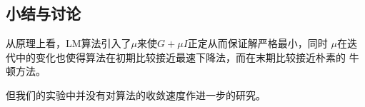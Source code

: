 \documentclass[10pt,a4paper]{article}
\theoremstyle{mythm}%
\numberwithin{equation}{section}
\begin{document}
\begin{CJK*}{UTF8}{wqyzh}
\subsection{小结与讨论}

从原理上看，LM算法引入了$\mu$来使$G + \mu I$正定从而保证解严格最小，同时
$\mu$在迭代中的变化也使得算法在初期比较接近最速下降法，而在末期比较接近朴素的
牛顿方法。

但我们的实验中并没有对算法的收敛速度作进一步的研究。

%
%

\end{CJK*}
\end{document}
